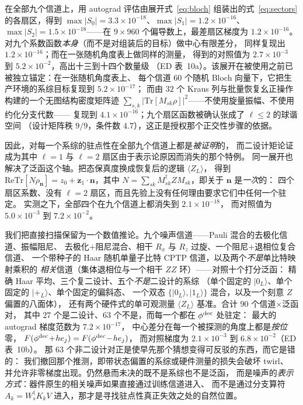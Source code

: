 \documentclass[11pt,a4paper]{article}
\newcommand{\ket}[1]{\lvert #1\rangle}
\newcommand{\tr}{\mathrm{Tr}}
\newcommand{\re}{\mathrm{Re}}
\begin{document}
在全部九个信道上，用 autograd 评估由展开式~\eqref{eq:bloch} 组装出的式~\eqref{eq:sectors}
的各扇区，得到 $\max|S_0|=3.3\times10^{-18}$、$\max|S_1|=1.2\times10^{-16}$、
$\max|S_2|=1.5\times10^{-18}$——在 $9\times960$ 个偏导数上，最差扇区梯度为
$1.2\times10^{-16}$。对九个系数函数\emph{本身}（而不是对组装后的目标）做中心有限差分，
同样复现出 $1.2\times10^{-16}$；而在一张随机角度表上做同样的测量，
得到的对照值为 $2.7\times10^{-3}$ 到 $5.2\times10^{-2}$，高出十三到十四个数量级
（ED 表~10a）。该展开在被使用之前已被独立锚定：在一张随机角度表上、
每个信道 $60$ 个随机 Bloch 向量下，它把生产环境的系综目标复现到 $5.2\times10^{-17}$；
而由 $32$ 个 Kraus 列与批量恢复幺正操作构建的一个无图结构密度矩阵迹
$\sum_{s,k}|\tr[M_{sk}\rho]|^2$——不使用旋量振幅、不使用约化分支代数——
复现到 $4.1\times10^{-16}$；九个扇区函数被确认张成了 $\ell\le2$ 的球谐空间
（设计矩阵秩 $9/9$，条件数 $4.7$），这正是授权那个正交性步骤的依据。

因此，对每一个系综的驻点性在全部九个信道上都是\emph{被证明}的，
而二设计矩论证成为其中 $\ell=1$ 与 $\ell=2$ 扇区由于表示论原因而消失的那个特例。
同一展开也解决了泛函这个轴。把态保真度换成恢复后的逻辑 $\langle Z_L\rangle$，
得到 $\re\tr[N\rho_{\mathbf n}]=z_0+\mathbf z_1\!\cdot\!\mathbf n$，其中
$N=\sum_{sk}M_{sk}^\dagger ZM_{sk}$，即关于 $\mathbf n$ 是\emph{一次}的：
四个扇区系数、没有 $\ell=2$ 扇区，而且先验上没有任何理由要求它们中任何一个驻定。
实测之下，全部四个在九个信道上都消失到 $2.1\times10^{-18}$，
而对照值为 $5.0\times10^{-3}$ 到 $7.2\times10^{-2}$。

我们把直接扫描保留为一个数值推论。九个噪声信道——Pauli 混合的去极化信道、振幅阻尼、
去极化$+$阻尼混合、相干 $R_x$ 与 $R_z$ 过旋、一个阻尼$+$退相位复合信道、
一个带种子的 Haar 随机单量子比特 CPTP 信道，以及两个\emph{不是}单比特映射乘积的
\emph{相关}信道（集体退相位与一个相干 $ZZ$ 环）——对照十个打分泛函：
精确 Haar 平均、三个复二设计、五个\emph{不是}二设计的系综
（单个固定的 $\ket{0_L}$、单个固定的 $\ket{+_L}$、单个固定的偏斜态、
一个双态 $\{\ket{0_L},\ket{1_L}\}$ 混合，以及一个刻意 $Z$ 偏置的八面体），
还有两个硬件式的单可观测量 $\langle Z_L\rangle$ 基准。合计 $90$ 个信道$\times$泛函对，
其中 $27$ 个是二设计、$63$ 个不是，而每一个都在 $\phi^{\rm dec}$ 处驻定：
最大的 autograd 梯度范数为 $7.2\times10^{-17}$，
中心差分在每一个被探测的角度上都是\emph{按位}零，
$F(\phi^{\rm dec}\!+\!he_j)=F(\phi^{\rm dec}\!-\!he_j)$，
而对照梯度为 $2.1\times10^{-3}$ 到 $6.8\times10^{-2}$（ED 表~10b）。
那 $63$ 个非二设计对正是使早先那个猜想变得可反驳的东西，而它是错的：
我们撤回那个推测，即带状态偏置的系综或硬件测量的损失会破坏 twirl、
并允许非零梯度出现。仍然悬而未决的既不是系综也不是泛函，
而是噪声的\emph{表示方式}：器件原生的相关噪声如果直接通过训练信道进入、
而不是通过分支算符 $A_k=W_s^\dagger K_kV$ 进入，那才是寻找驻点性真正失效之处的自然位置。
\end{document}
